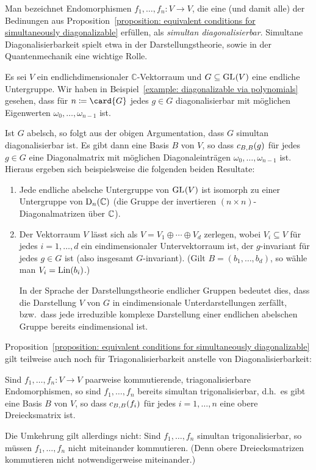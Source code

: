 Man bezeichnet Endomorphismen $f_1, \dotsc, f_n \colon V \to V$, die eine (und damit alle) der Bedinungen aus Proposition~\ref{proposition: equivalent conditions for simultaneously diagonalizable} erfüllen, als \emph{simultan diagonalisierbar}.
Simultane Diagonalisierbarkeit spielt etwa in der Darstellungstheorie, sowie in der Quantenmechanik eine wichtige Rolle.

\begin{example}
  Es sei $V$ ein endlichdimensionaler $\mathbb{C}$-Vektorraum und $G \subseteq \GL{}{V}$ eine endliche Untergruppe.
  Wir haben in Beispiel~\ref{example: diagonalizable via polynomials} gesehen, dass für $n \defined \card{G}$ jedes $g \in G$ diagonalisierbar mit möglichen Eigenwerten $\omega_0, \dotsc, \omega_{n-1}$ ist.
  
  Ist $G$ abelsch, so folgt aus der obigen Argumentation, dass $G$ simultan diagonalisierbar ist.
  Es gibt dann eine Basis $B$ von $V$, so dass $\repmatrixendo{g}{B}$ für jedes $g \in G$ eine Diagonalmatrix mit möglichen Diagonaleinträgen $\omega_0, \dotsc, \omega_{n-1}$ ist.
  Hieraus ergeben sich beispielsweise die folgenden beiden Resultate:
  \begin{enumerate}
    \item
      Jede endliche abelsche Untergruppe von $\GL{}{V}$ ist isomorph zu einer Untergruppe von $\diagonalgroup{n}{\Complex}$ (die Gruppe der invertieren $(n \times n)$-Diagonalmatrizen über $\Complex$).
    \item
      Der Vektorraum $V$ lässt sich als $V = V_1 \oplus \dotsb \oplus V_d$ zerlegen, wobei $V_i \subseteq V$ für jedes $i = 1, \dotsc, d$ ein eindimensionaler Untervektorraum ist, der $g$-invariant für jedes $g \in G$ ist (also insgesamt $G$-invariant).
      (Gilt $B = (b_1, \dotsc, b_d)$, so wähle man $V_i = \Lin(b_i)$.)
      
      In der Sprache der Darstellungstheorie endlicher Gruppen bedeutet dies, dass die Darstellung $V$ von $G$ in eindimensionale Unterdarstellungen zerfällt, bzw.\ dass jede irreduzible komplexe Darstellung einer endlichen abelschen Gruppe bereits eindimensional ist.
  \end{enumerate}
\end{example}

\begin{remark}
  Proposition~\ref{proposition: equivalent conditions for simultaneously diagonalizable} gilt teilweise auch noch für Triagonalisierbarkeit anstelle von Diagonalisierbarkeit:
  
  Sind $f_1, \dotsc, f_n \colon V \to V$ paarweise kommutierende, triagonalisierbare Endomorphismen, so sind $f_1, \dotsc, f_n$ bereits simultan trigonalisierbar, d.h.\ es gibt eine Basis $B$ von $V$, so dass $\repmatrixendo{f_i}{B}$ für jedes $i = 1, \dotsc, n$ eine obere Dreiecksmatrix ist.
  
  Die Umkehrung gilt allerdings nicht:
  Sind $f_1, \dotsc, f_n$ simultan trigonalisierbar, so müssen $f_1, \dotsc, f_n$ nicht miteinander kommutieren.
  (Denn obere Dreiecksmatrizen kommutieren nicht notwendigerweise miteinander.)
\end{remark}

